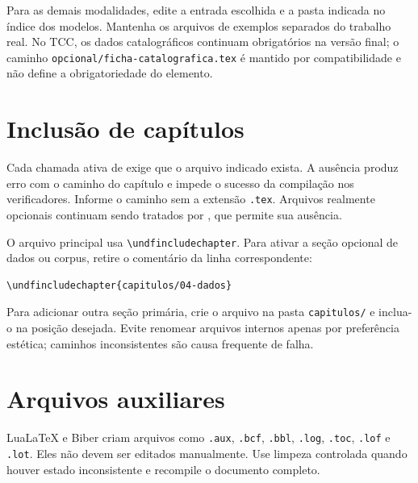 Para as demais modalidades, edite a entrada escolhida e a pasta indicada no
índice dos modelos. Mantenha os arquivos de exemplos separados do trabalho real.
No TCC, os dados catalográficos continuam obrigatórios na versão final; o caminho
\texttt{opcional/ficha-catalografica.tex} é mantido por compatibilidade e não
define a obrigatoriedade do elemento.

\section{Inclusão de capítulos}

Cada chamada ativa de \texttt{\string\undfincludechapter} exige que o arquivo
indicado exista. A ausência produz erro com o caminho do capítulo e impede
o sucesso da compilação nos verificadores. Informe o caminho sem a extensão
\texttt{.tex}. Arquivos realmente opcionais continuam sendo tratados por
\texttt{\string\undfinputoptional}, que permite sua ausência.

O arquivo principal usa \texttt{\textbackslash undfincludechapter}. Para ativar a seção opcional de dados ou corpus, retire o comentário da linha correspondente:

\begin{lstlisting}
\undfincludechapter{capitulos/04-dados}
\end{lstlisting}

Para adicionar outra seção primária, crie o arquivo na pasta \texttt{capitulos/} e inclua-o na posição desejada. Evite renomear arquivos internos apenas por preferência estética; caminhos inconsistentes são causa frequente de falha.

\section{Arquivos auxiliares}

LuaLaTeX e Biber criam arquivos como \texttt{.aux}, \texttt{.bcf}, \texttt{.bbl}, \texttt{.log}, \texttt{.toc}, \texttt{.lof} e \texttt{.lot}. Eles não devem ser editados manualmente. Use limpeza controlada quando houver estado inconsistente e recompile o documento completo.
